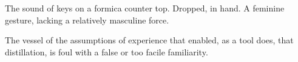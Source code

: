 

The sound of keys on a formica counter top. \break  Dropped, in hand.  A feminine gesture, lacking a relatively masculine force.  


The vessel of the assumptions of experience that enabled, as a tool does, that distillation, is foul with a false or too facile familiarity.
\bye
